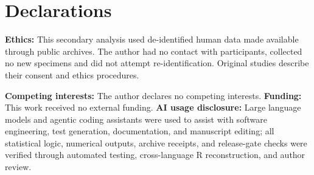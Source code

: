 \documentclass[11pt]{article}
\begin{document}
\section*{Declarations}
\noindent\textbf{Ethics:} This secondary analysis used de-identified human data made available through public archives. The author had no contact with participants, collected no new specimens and did not attempt re-identification. Original studies describe their consent and ethics procedures.

\noindent\textbf{Competing interests:} The author declares no competing interests. \textbf{Funding:} This work received no external funding. \textbf{AI usage disclosure:} Large language models and agentic coding assistants were used to assist with software engineering, test generation, documentation, and manuscript editing; all statistical logic, numerical outputs, archive receipts, and release-gate checks were verified through automated testing, cross-language R reconstruction, and author review.

\nocite{*}


\end{document}
